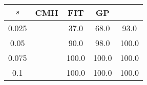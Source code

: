 \centering \begin{tabular}{c|c|c|c|c}
$s$	&CMH	&FIT	&GP	&\sc{Clear}\\\hline
0.025	&	&37.0	&68.0	&93.0\\
0.05	&	&90.0	&98.0	&100.0\\
0.075	&	&100.0	&100.0	&100.0\\
0.1	&	&100.0	&100.0	&100.0\\
\end{tabular}
